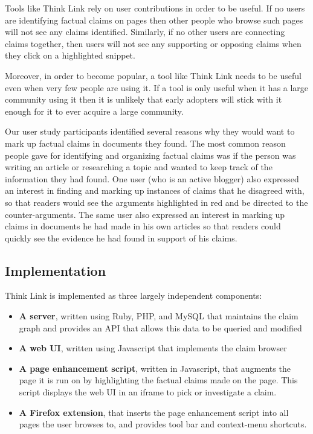 \documentclass{chi2009}
\begin{document}
Tools like Think Link rely on user contributions in order to be useful. If no users are identifying factual claims on pages then other people who browse such pages will not see any claims identified. Similarly, if no other users are connecting claims together, then users will not see any supporting or opposing claims when they click on a highlighted snippet.

Moreover, in order to become popular, a tool like Think Link needs to be useful even when very few people are using it. If a tool is only useful when it has a large community using it then it is unlikely that early adopters will stick with it enough for it to ever acquire a large community.

Our user study participants identified several reasons why they would want to mark up factual claims in documents they found. The most common reason people gave for identifying and organizing factual claims was if the person was writing an article or researching a topic and wanted to keep track of the information they had found. One user (who is an active blogger) also expressed an interest in finding and marking up instances of claims that he disagreed with, so that readers would see the arguments highlighted in red and be directed to the counter-arguments. The same user also expressed an interest in marking up claims in documents he had made in his own articles so that readers could quickly see the evidence he had found in support of his claims.


\subsection{Implementation}

Think Link is implemented as three largely independent components:

\begin{itemize}
\item {\bf A server}, written using Ruby, PHP, and MySQL that maintains the claim graph and provides an API that allows this data to be queried and modified
\item {\bf A web UI}, written using Javascript that implements the claim browser
\item {\bf A page enhancement script}, written in Javascript, that augments the page it is run on by highlighting the factual claims made on the page. This script displays the web UI in an iframe to pick or investigate a claim.
\item {\bf A Firefox extension}\cite{firefoxextend}, that inserts the page enhancement script into all pages the user browses to, and provides tool bar and context-menu shortcuts.
\end{itemize}
\end{document}
